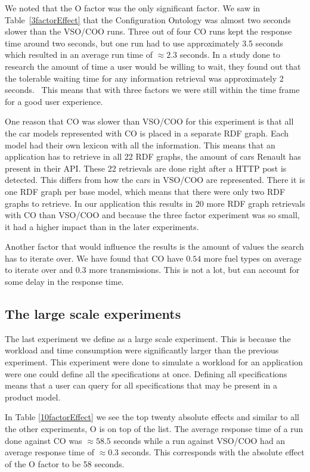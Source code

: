 \documentclass{llncs}
\begin{document}
We noted that the O factor was the only significant factor. 
We saw in Table~\ref{3factorEffect} that the
Configuration Ontology was almost two seconds slower than the VSO/COO
runs.  Three out of four CO runs kept the response time around two
seconds, but one run had to use approximately 3.5 seconds which
resulted in an average run time of $\approx2.3$ seconds.  In a study
done to research the amount of time a user would be willing to wait,
they found out that the tolerable waiting time for any information
retrieval was approximately 2 seconds.~\cite{waitTime} This means that
with three factors we were still within the time frame for a good user
experience.

One reason that CO was slower than VSO/COO for this experiment is that
all the car models represented with CO is placed in a separate RDF
graph. Each model had their own lexicon with all the information.
This means that an application has to retrieve in all 22 RDF graphs,
the amount of cars Renault has present in their API. These 22
retrievals are done right after a HTTP post is detected. This differs
from how the cars in VSO/COO are represented. There it is one RDF
graph per base model, which means that there were only two RDF graphs
to retrieve.  In our application this results in 20 more RDF graph
retrievals with CO than VSO/COO and because the three factor
experiment was so small, it had a higher impact than in the later
experiments.

Another factor that would influence the results is the amount of
values the search has to iterate over.  We have found that CO have
$0.54$ more fuel types on average to iterate over and $0.3$ more
transmissions. This is not a lot, but can account for some delay in
the response time.

\subsection{The large scale experiments}
The last experiment we define as a large scale experiment. This is
because the workload and time consumption were significantly larger
than the previous experiment. This experiment were done
to simulate a workload for an application were one could define all
the specifications at once. Defining all specifications means that a
user can query for all specifications that may be present in a product
model.

In Table \ref{10factorEffect} we see the top twenty absolute effects
and similar to all the other experiments, O is on top of the list. The
average response time of a run done against CO was $\approx58.5$
seconds while a run against VSO/COO had an average response time of
$\approx0.3$ seconds.  This corresponds with the absolute effect of
the O factor to be 58 seconds.
 
\end{document}
